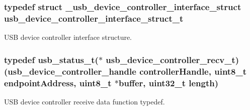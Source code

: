 \hypertarget{group__usb__device__controller__driver_ga634411452886b58586be873d8d631a3b}{
\subsubsection[{usb\-\_\-device\-\_\-controller\-\_\-interface\-\_\-struct\-\_\-t}]{\setlength{\rightskip}{0pt plus 5cm}typedef struct {\bf \-\_\-usb\-\_\-device\-\_\-controller\-\_\-interface\-\_\-struct}  {\bf usb\-\_\-device\-\_\-controller\-\_\-interface\-\_\-struct\-\_\-t}}}\label{group__usb__device__controller__driver_ga634411452886b58586be873d8d631a3b}


U\-S\-B device controller interface structure. 

\hypertarget{group__usb__device__controller__driver_gac14df7129a0dc5e7c0b7148b05992dc8}{
\subsubsection[{usb\-\_\-device\-\_\-controller\-\_\-recv\-\_\-t}]{\setlength{\rightskip}{0pt plus 5cm}typedef {\bf usb\-\_\-status\-\_\-t}($\ast$ usb\-\_\-device\-\_\-controller\-\_\-recv\-\_\-t)({\bf usb\-\_\-device\-\_\-controller\-\_\-handle} controller\-Handle, uint8\-\_\-t endpoint\-Address, uint8\-\_\-t $\ast$buffer, uint32\-\_\-t length)}}\label{group__usb__device__controller__driver_gac14df7129a0dc5e7c0b7148b05992dc8}


U\-S\-B device controller receive data function typedef. 

